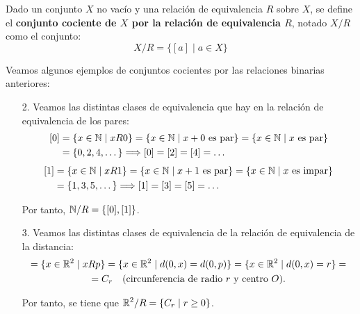 \begin{definicion}
    Dado un conjunto $X$ no vacío y una relación de equivalencia $R$ sobre $X$, se define el
    \textbf{conjunto cociente de $X$ por la relación de equivalencia $R$}, notado $X/R$ como el conjunto:
    $$X/R = \{[a] \mid a \in X\}$$
\end{definicion}

\begin{ejemplo} Veamos algunos ejemplos de conjuntos cocientes por las relaciones binarias anteriores:
\begin{enumerate}
    \item[2.] Veamos las distintas clases de equivalencia que hay en la relación de equivalencia de los pares:
    \begin{equation*}
        \begin{split}
            [0] &= \{x\in \mathbb{N} \mid xR0\} = \{x\in \mathbb{N}\mid x+0 \text{ es par}\} = \{x\in \mathbb{N}\mid x \text{ es par}\} \\&= \{0,2,4,\dots\} \Longrightarrow [0]=[2]=[4]=\dots
        \end{split}
    \end{equation*}
    \begin{equation*}
        \begin{split}
            [1] &= \{x\in \mathbb{N} \mid xR1\} = \{x\in \mathbb{N}\mid x+1 \text{ es par}\} = \{x\in \mathbb{N}\mid x \text{ es impar}\} \\&= \{1,3,5,\dots\} \Longrightarrow [1]=[3]=[5]=\dots
        \end{split}
    \end{equation*}

    Por tanto, $\displaystyle \mathbb{N}/R = \{[0],[1]\}$.

    \item[3.] Veamos las distintas clases de equivalencia de la relación de equivalencia de la distancia:
    \begin{multline*}
        [p] = \{x\in \bb{R}^2\mid xRp\} = \{x\in \bb{R}^2\mid d(0,x)=d(0,p)\} = \{x\in \bb{R}^2\mid d(0,x)=r\} =\\= C_r \quad \text{(circunferencia de radio $r$ y centro $O$)}.
    \end{multline*}

    Por tanto, se tiene que $\displaystyle \mathbb{R}^2/R = \{C_r\mid r\geq 0\}$.
\end{enumerate}
\end{ejemplo}

